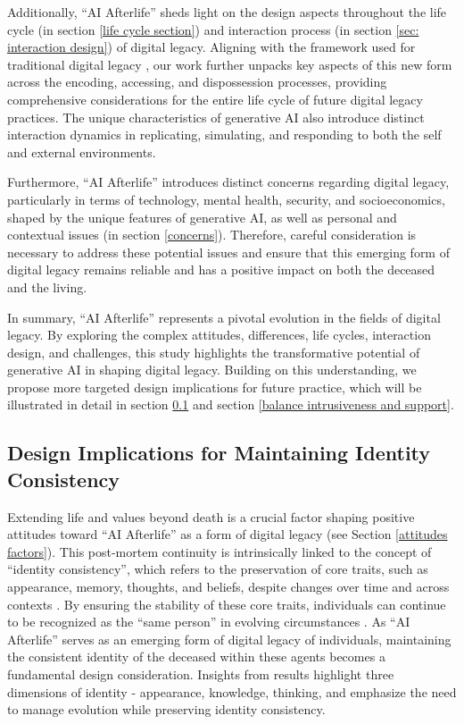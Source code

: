 Additionally, ``AI Afterlife'' sheds light on the design aspects throughout the life cycle (in section \ref{life cycle section}) and interaction process (in section \ref{sec: interaction design}) of digital legacy.
Aligning with the framework used for traditional digital legacy \cite{doyle2023digital}, our work further unpacks key aspects of this new form across the encoding, accessing, and dispossession processes, providing comprehensive considerations for the entire life cycle of future digital legacy practices. The unique characteristics of generative AI also introduce distinct interaction dynamics in replicating, simulating, and responding to both the self and external environments.

Furthermore, ``AI Afterlife'' introduces distinct concerns regarding digital legacy, particularly in terms of technology, mental health, security, and socioeconomics, shaped by the unique features of generative AI, as well as personal and contextual issues (in section \ref{concerns}). Therefore, careful consideration is necessary to address these potential issues and ensure that this emerging form of digital legacy remains reliable and has a positive impact on both the deceased and the living.

In summary, ``AI Afterlife'' represents a pivotal evolution in the fields of digital legacy. By exploring the complex attitudes, differences, life cycles, interaction design, and challenges, this study highlights the transformative potential of generative AI in shaping digital legacy. Building on this understanding, we propose more targeted design implications for future practice, which will be illustrated in detail in section \ref{identity consistency} and section \ref{balance intrusiveness and support}.


\subsection{Design Implications for Maintaining Identity Consistency} \label{identity consistency}

Extending life and values beyond death is a crucial factor shaping positive attitudes toward ``AI Afterlife'' as a form of digital legacy (see Section \ref{attitudes factors}). This post-mortem continuity is intrinsically linked to the concept of ``identity consistency'', which refers to the preservation of core traits, such as appearance, memory, thoughts, and beliefs, despite changes over time and across contexts \cite{wyness2019childhood, marcia1966development, taylor1989sources}. By ensuring the stability of these core traits, individuals can continue to be recognized as the ``same person'' in evolving circumstances \cite{hume2000treatise, locke1847essay, wyness2019childhood}. As ``AI Afterlife'' serves as an emerging form of digital legacy of individuals, maintaining the consistent identity of the deceased within these agents becomes a fundamental design consideration. Insights from results highlight three dimensions of identity - appearance, knowledge, thinking, and emphasize the need to manage evolution while preserving identity consistency.

